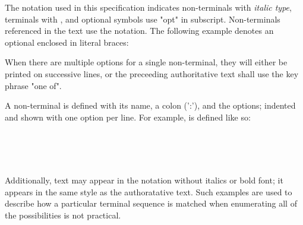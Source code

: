 


\specsubitem
The notation used in this specification indicates non-terminals with
\textit{italic type}, terminals with , and optional
symbols use "opt" in subscript. Non-terminals referenced in the text use the
 notation. The following example denotes an optional
 enclosed in literal braces:

\begin{grammar}
\terminal{\{}  \terminal{\}}
\end{grammar}

\specsubitem
When there are multiple options for a single non-terminal, they will either be
printed on successive lines, or the preceeding authoritative text shall use the
key phrase "one of".

\specsubitem
A non-terminal is defined with its name, a colon (':'), and the options;
indented and shown with one option per line. For example,
 is defined like so:

\begin{grammar}
\\
\\
 \terminal{,}\\
 \terminal{,} 
\end{grammar}

\specsubitem
Additionally, text may appear in the notation without italics or bold font; it
appears in the same style as the authoratative text. Such examples are used to
describe how a particular terminal sequence is matched when enumerating all of
the possibilities is not practical.

\begin{grammar}
 \\
\end{grammar}






